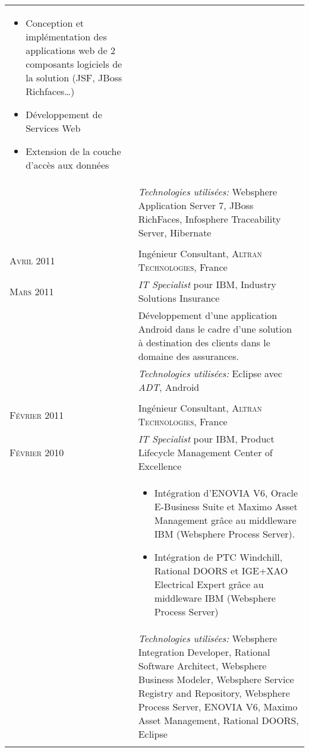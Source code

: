 \begin{longtable}{R{2.5cm}|p{14.8cm}}
{\begin{itemize}
			\item Conception et implémentation des applications web de 2 composants logiciels de la solution (JSF, JBoss Richfaces\ldots)
			\item Développement de Services Web
			\item Extension de la couche d'accès aux données
		\end{itemize}
		\vspace{-1em}
	}\\&
 	\footnotesize{\emph{Technologies utilisées:} Websphere Application Server 7, JBoss RichFaces, Infosphere Traceability Server, Hibernate }\\
  \\
 	\textsc{Avril 2011} & Ingénieur Consultant, \textsc{Altran Technologies}, France\\
 	\textsc{Mars 2011}& \emph{IT Specialist} pour IBM, Industry Solutions Insurance\\&
 	\footnotesize{Développement d'une application Android dans le cadre d'une solution à destination 
 	des clients dans le domaine des assurances.}\\&
 	\footnotesize{\emph{Technologies utilisées:} Eclipse avec \emph{ADT}, Android}\\
  \\
\pagebreak[4]
 	\textsc{Février 2011} & Ingénieur Consultant, \textsc{Altran Technologies}, France\\
 	\textsc{Février 2010}& \emph{IT Specialist} pour IBM, Product Lifecycle Management Center of Excellence\\&
 	\footnotesize{
 		\begin{itemize}
 			\item Intégration d'ENOVIA V6, Oracle E-Business Suite et Maximo Asset Management grâce au middleware IBM (Websphere Process Server).
 			\item Intégration de PTC Windchill, Rational DOORS et IGE+XAO Electrical Expert grâce au middleware IBM (Websphere Process Server)
 		\end{itemize}
 		\vspace{-1em}
 	}\\&
 	\footnotesize{\emph{Technologies utilisées:} Websphere Integration Developer, Rational Software Architect, Websphere Business Modeler, Websphere Service Registry and Repository, 
 	Websphere Process Server, ENOVIA V6, Maximo Asset Management, Rational DOORS, Eclipse }\\
  \\

\end{longtable}
